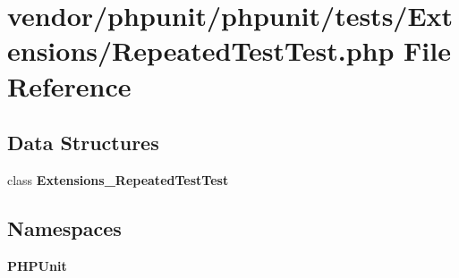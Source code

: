 \section{vendor/phpunit/phpunit/tests/\+Extensions/\+Repeated\+Test\+Test.php File Reference}
\label{_repeated_test_test_8php}
\subsection*{Data Structures}
\begin{DoxyCompactItemize}
\item 
class {\bf Extensions\+\_\+\+Repeated\+Test\+Test}
\end{DoxyCompactItemize}
\subsection*{Namespaces}
\begin{DoxyCompactItemize}
\item 
 {\bf P\+H\+P\+Unit}
\end{DoxyCompactItemize}
